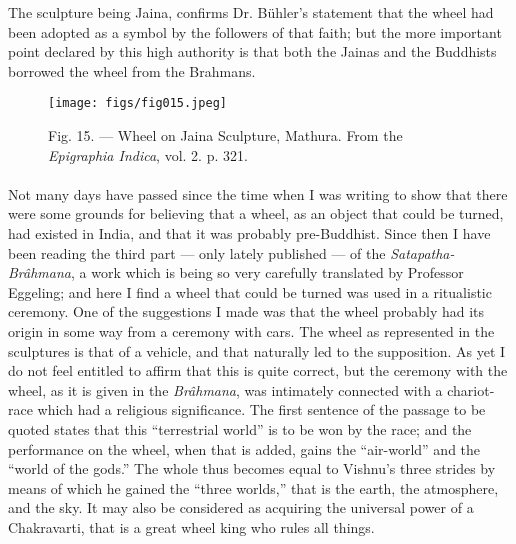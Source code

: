\documentclass[a4paper, 11pt, oneside, polutonikogreek, english]{article}
\begin{document}
The sculpture being Jaina, confirms Dr. Bühler's statement that the wheel had been adopted as a symbol by the followers of that faith; but the more important point declared by this high authority is that both the Jainas and the Buddhists borrowed the wheel from the Brahmans.

\begin{figure}[H]
\centering
\texttt{[image: figs/fig015.jpeg]}
\caption[Fig. 15. --- Wheel on Jaina Sculpture, Mathura.]{Fig. 15. --- Wheel on Jaina Sculpture, Mathura. From the \emph{Epigraphia Indica}, vol. 2. p. 321.}
\end{figure}
\paragraph{}
Not many days have passed since the time when I was writing to show that there were some grounds for believing that a wheel, as an object that could be turned, had existed in India, and that it was probably pre-Buddhist. Since then I have been reading the third part --- only lately published --- of the \emph{Satapatha-Brâhmana}, a work which is being so very carefully translated by Professor Eggeling; and here I find a wheel that could be turned was used in a ritualistic ceremony. One of the suggestions I made was that the wheel probably had its origin in some way from a ceremony with cars. The wheel as represented in the sculptures is that of a vehicle, and that naturally led to the supposition. As yet I do not feel entitled to affirm that this is quite correct, but the ceremony with the wheel, as it is given in the \emph{Brâhmana}, was intimately connected with a chariot-race which had a religious significance. The first sentence of the passage to be quoted states that this ``terrestrial world'' is to be won by the race; and the performance on the wheel, when that is added, gains the ``air-world'' and the ``world of the gods.'' The whole thus becomes equal to Vishnu's three strides by means of which he gained the ``three worlds,'' that is the earth, the atmosphere, and the sky. It may also be considered as acquiring the universal power of a Chakravarti, that is a great wheel king who rules all things.
\end{document}

